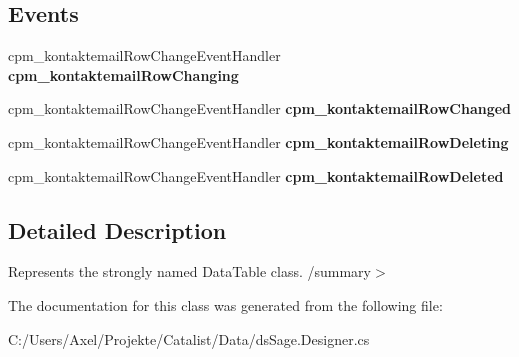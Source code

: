\subsection*{Events}
\begin{DoxyCompactItemize}
\item 
cpm\+\_\+kontaktemail\+Row\+Change\+Event\+Handler {\bfseries cpm\+\_\+kontaktemail\+Row\+Changing}\hypertarget{class_products_1_1_data_1_1ds_sage_1_1cpm__kontaktemail_data_table_a94cf6d12c78fd19e56e055e1d930bc26}{}\label{class_products_1_1_data_1_1ds_sage_1_1cpm__kontaktemail_data_table_a94cf6d12c78fd19e56e055e1d930bc26}

\item 
cpm\+\_\+kontaktemail\+Row\+Change\+Event\+Handler {\bfseries cpm\+\_\+kontaktemail\+Row\+Changed}\hypertarget{class_products_1_1_data_1_1ds_sage_1_1cpm__kontaktemail_data_table_a95fe958494b1759cae36dd36e78c8a20}{}\label{class_products_1_1_data_1_1ds_sage_1_1cpm__kontaktemail_data_table_a95fe958494b1759cae36dd36e78c8a20}

\item 
cpm\+\_\+kontaktemail\+Row\+Change\+Event\+Handler {\bfseries cpm\+\_\+kontaktemail\+Row\+Deleting}\hypertarget{class_products_1_1_data_1_1ds_sage_1_1cpm__kontaktemail_data_table_a2ab0c5f8a06c5edd278483d4e1be88bd}{}\label{class_products_1_1_data_1_1ds_sage_1_1cpm__kontaktemail_data_table_a2ab0c5f8a06c5edd278483d4e1be88bd}

\item 
cpm\+\_\+kontaktemail\+Row\+Change\+Event\+Handler {\bfseries cpm\+\_\+kontaktemail\+Row\+Deleted}\hypertarget{class_products_1_1_data_1_1ds_sage_1_1cpm__kontaktemail_data_table_a7bbdce711d23f1f1c9e198497e426541}{}\label{class_products_1_1_data_1_1ds_sage_1_1cpm__kontaktemail_data_table_a7bbdce711d23f1f1c9e198497e426541}

\end{DoxyCompactItemize}


\subsection{Detailed Description}
Represents the strongly named Data\+Table class. /summary$>$ 

The documentation for this class was generated from the following file\+:\begin{DoxyCompactItemize}
\item 
C\+:/\+Users/\+Axel/\+Projekte/\+Catalist/\+Data/ds\+Sage.\+Designer.\+cs\end{DoxyCompactItemize}

